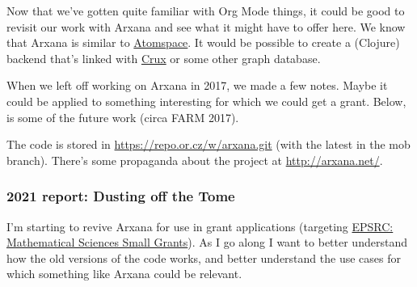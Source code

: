 \documentclass[11pt]{article}
\begin{document}
Now that we’ve gotten quite familiar with Org Mode things, it could be
good to revisit our work with Arxana and see what it might have to
offer here.  We know that Arxana is similar to \href{https://github.com/opencog/atomspace}{Atomspace}.  It would be
possible to create a (Clojure) backend that’s linked with \href{https://github.com/juxt/crux}{Crux} or some
other graph database.

When we left off working on Arxana in 2017, we made a few notes.
Maybe it could be applied to something interesting for which we could
get a grant. Below, is some of the future work (circa FARM 2017).

The code is stored in \href{https://repo.or.cz/w/arxana.git}{https://repo.or.cz/w/arxana.git} (with the latest
in the mob branch).  There’s some propaganda about the project at
\href{http://arxana.net/}{http://arxana.net/}.

\subsubsection{2021 report: Dusting off the Tome}
\label{sec:orga087c2c}

I’m starting to revive Arxana for use in grant applications
(targeting \hyperref[sec:org5fa6f60]{EPSRC: Mathematical Sciences Small Grants}).  As I go along I want to
better understand how the old versions of the code works, and better
understand the use cases for which something like Arxana could be
relevant.
\end{document}
